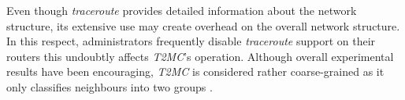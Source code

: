 Even though {\sl traceroute}
provides detailed information about the network structure, 
its extensive use may create overhead on the overall network structure. 
In this respect, administrators frequently
disable {\sl traceroute} support on their routers this 
undoubtly affects \emph{T2MC}'s operation.
Although overall experimental results have been encouraging, 
\emph{T2MC} is considered rather coarse-grained as it only
classifies neighbours into two groups \cite{QLZG2009}.
%
%
%
%
